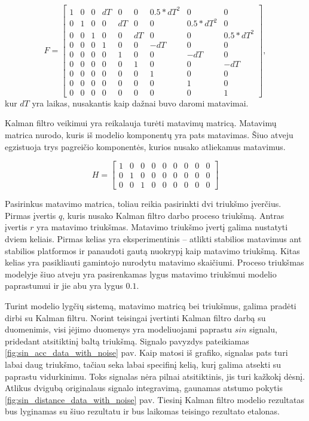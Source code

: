 \begin{equation}
    F = \begin{bmatrix}
        1 & 0 & 0 & dT & 0 & 0 & 0.5*dT^2 & 0 & 0 \\
        0 & 1 & 0 & 0 & dT & 0 & 0 & 0.5*dT^2 & 0 \\
        0 & 0 & 1 & 0 & 0 & dT & 0 & 0 & 0.5*dT^2 \\
        0 & 0 & 0 & 1 & 0 & 0 & -dT & 0 & 0 \\
        0 & 0 & 0 & 0 & 1 & 0 & 0 & -dT & 0 \\
        0 & 0 & 0 & 0 & 0 & 1 & 0 & 0 & -dT \\
        0 & 0 & 0 & 0 & 0 & 0 & 1 & 0 & 0 \\
        0 & 0 & 0 & 0 & 0 & 0 & 0 & 1 & 0 \\
        0 & 0 & 0 & 0 & 0 & 0 & 0 & 0 & 1
    \end{bmatrix},
\end{equation}
kur $dT$ yra laikas, nusakantis kaip dažnai buvo daromi matavimai.

Kalman filtro veikimui yra reikalauja turėti matavimų matricą.
Matavimų matrica nurodo, kuris iš modelio komponentų yra pats matavimas.
Šiuo atveju egzistuoja trys pagreičio komponentės, kurios nusako atliekamus matavimus.

\begin{equation}
    H = \begin{bmatrix}
        1 & 0 & 0 & 0 & 0 & 0 & 0 & 0 & 0 \\
        0 & 1 & 0 & 0 & 0 & 0 & 0 & 0 & 0 \\
        0 & 0 & 1 & 0 & 0 & 0 & 0 & 0 & 0
    \end{bmatrix}
\end{equation}

Pasirinkus matavimo matrica, toliau reikia pasirinkti dvi triukšmo įverčius.
Pirmas įvertis $q$, kuris nusako Kalman filtro darbo proceso triukšmą.
Antras įvertis $r$ yra matavimo triukšmas. 
Matavimo triukšmo įvertį galima nustatyti dviem keliais. 
Pirmas kelias yra eksperimentinis -- atlikti stabilios matavimus ant stabilios platformos ir panaudoti gautą nuokrypį kaip matavimo triukšmą.
Kitas kelias yra pasikliauti gamintojo nurodytu matavimo skaičiumi.
Proceso triukšmas modelyje šiuo atveju yra pasirenkamas lygus matavimo triukšmui modelio paprastumui ir jie abu yra lygus $0.1$.

Turint modelio lygčių sistemą, matavimo matricą bei triukšmus, galima pradėti dirbi su Kalman filtru.
Norint teisingai įvertinti Kalman filtro darbą su duomenimis, visi įėjimo duomenys yra modeliuojami paprastu $sin$ signalu, pridedant atsitiktinį baltą triukšmą.
Signalo pavyzdys pateikiamas \ref{fig:sin_acc_data_with_noise} pav.
Kaip matosi iš grafiko, signalas pats turi labai daug triukšmo, tačiau seka labai specifinį kelią, kurį galima atsekti su paprastu vidurkinimu.
Toks signalas nėra pilnai atsitiktinis, jis turi kažkokį dėsnį.
Atlikus dvigubą originalaus signalo integravimą, gaunamas atstumo pokytis \ref{fig:sin_distance_data_with_noise} pav.
Tiesinį Kalman filtro modelio rezultatas bus lyginamas su šiuo rezultatu ir bus laikomas teisingo rezultato etalonas.

